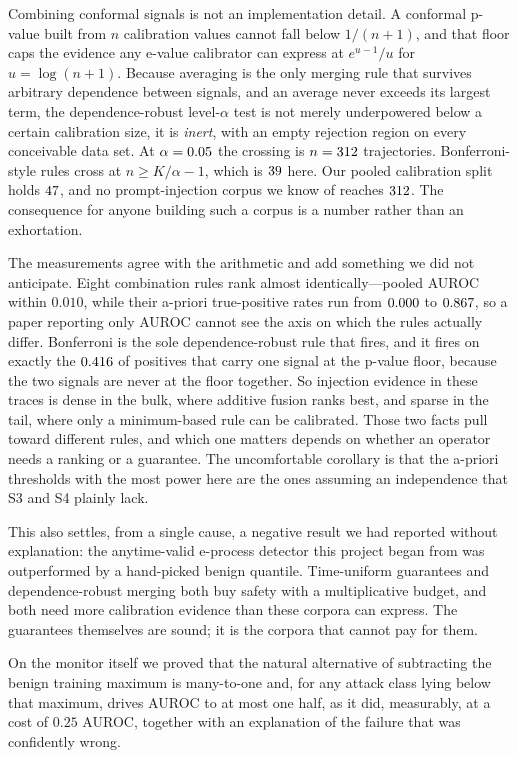 \documentclass[pdflatex,sn-basic]{sn-jnl}%
\theoremstyle{thmstyleone}
\theoremstyle{thmstyletwo}
\theoremstyle{thmstylethree}
\begin{document}
Combining conformal signals is not an implementation detail. A conformal p-value
built from $n$ calibration values cannot fall below $1/(n{+}1)$, and that floor caps
the evidence any e-value calibrator can express at $e^{u-1}/u$ for $u =
\log(n{+}1)$. Because averaging is the only merging rule that survives arbitrary
dependence between signals, and an average never exceeds its largest term, the
dependence-robust level-$\alpha$ test is not merely underpowered below a certain
calibration size, it is \emph{inert}, with an empty rejection region on every
conceivable data set. At $\alpha = 0.05$ the crossing is $n = 312$
trajectories. Bonferroni-style rules cross at $n \ge K/\alpha - 1$, which is
$39$ here. Our pooled calibration split holds $47$, and no
prompt-injection corpus we know of reaches $312$. The consequence for anyone
building such a corpus is a number rather than an exhortation.

The measurements agree with the arithmetic and add something we did not anticipate.
Eight combination rules rank almost identically---pooled AUROC within $0.010$, while
their a-priori true-positive rates run from $0.000$ to
$0.867$, so a paper reporting only AUROC cannot see the axis on which
the rules actually differ. Bonferroni is the sole dependence-robust rule that
fires, and it fires on exactly the $0.416$ of positives that carry one signal at
the p-value floor, because the two signals are never at the floor together. So
injection evidence in these traces is dense in the bulk, where additive fusion
ranks best, and sparse in the tail, where only a minimum-based rule can be
calibrated. Those two facts pull toward different rules, and which one matters
depends on whether an operator needs a ranking or a guarantee. The uncomfortable
corollary is that the a-priori thresholds with the most power here are the ones
assuming an independence that S3 and S4 plainly lack.

This also settles, from a single cause, a negative result we had reported without
explanation: the anytime-valid e-process detector this project began from was
outperformed by a hand-picked benign quantile. Time-uniform guarantees and
dependence-robust merging both buy safety with a multiplicative budget, and both
need more calibration evidence than these corpora can express. The guarantees
themselves are sound; it is the corpora that cannot pay for them.

On the monitor itself we proved that the natural alternative of subtracting the
benign training maximum is many-to-one and, for any attack class lying below that
maximum, drives AUROC to at most one half, as it did, measurably, at a cost of
$0.25$ AUROC, together with an explanation of the failure that was confidently
wrong.
\end{document}
